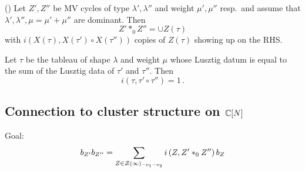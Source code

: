 \documentclass[draft]{article}
\begin{document}
\begin{proposition}(\cite{baumann2019mirkovic})
    Let $Z',Z''$  be MV cycles of type $\lambda',\lambda''$ and weight $\mu',\mu''$ resp.\ and assume that $\lambda',\lambda'',\mu = \mu' + \mu''$ are dominant. 
    Then 
    \begin{equation}
        Z'\ast_0 Z'' = \cup Z(\tau)
    \end{equation}
    with $i\left(X(\tau), X(\tau')\circ X(\tau'')\right)$ copies of $Z(\tau)$ showing up on the RHS. 
\end{proposition}
% 

\begin{conjecture}
    Let $\tau$ be the tableau of shape $\lambda$ and weight $\mu$ whose Lusztig datum is equal to the sum of the Lusztig data of $\tau'$ and $\tau''$. 
    Then 
    \begin{equation}
        i(\tau, 
        \tau' \circ \tau''
        ) = 1 \,. 
    \end{equation}
\end{conjecture}
% 
\subsection{Connection to cluster structure on $\mathbb C[N]$}
% 
Goal: 
$$
b_{Z'}b_{Z''} = \sum_{Z\in\mathcal Z(\infty)_{-\nu_1 - \nu_2}} i \left(
    Z, Z' \ast_0 Z''
\right) b_Z 
$$
\end{document}
